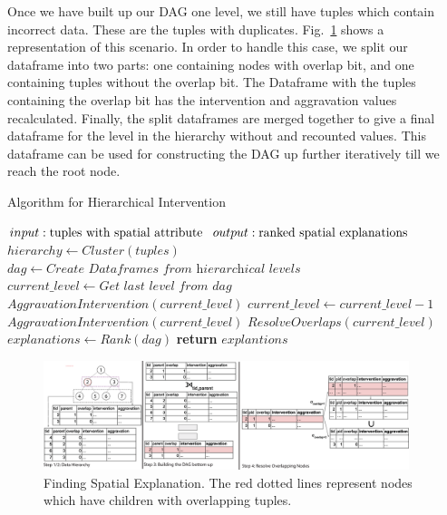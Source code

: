 Once we have built up our DAG one level, we still have tuples which contain incorrect data. These are the tuples with duplicates. Fig.~\ref{fig:steps} shows a representation of this scenario. In order to handle this case, we split our dataframe into two parts: one containing nodes with overlap bit, and one containing tuples without the overlap bit. The Dataframe with the tuples containing the overlap bit has the intervention and aggravation values recalculated. Finally, the split dataframes are merged together to give a final dataframe for the level in the hierarchy without and recounted values. This dataframe can be used for constructing the DAG up further iteratively till we reach the root node.

\begin{algorithm}
	\caption{Algorithm for Hierarchical Intervention}\label{alg:hieint}
	\begin{algorithmic}[1]
		\State $input: \textnormal{tuples with spatial attribute}$
		\State $output: \textnormal{ranked spatial explanations}$
		\State $hierarchy \gets Cluster(tuples)$
		\State $dag \gets \textit{Create Dataframes from hierarchical levels}$
		\State $current\_level \gets \textit{Get last level from }dag$
		\State $AggravationIntervention(current\_level)$
		\State $current\_level \gets current\_level - 1$
		\State $AggravationIntervention(current\_level)$
		\State $ResolveOverlaps(current\_level)$
		\EndWhile
		\State $explanations \gets Rank(dag)$
		\State \textbf{return} $explantions$
		\EndProcedure
	\end{algorithmic}
\end{algorithm}




\begin{figure}[t]
	\centerline{\includegraphics[width=0.95\textwidth]{images/steps}}
	\caption{Finding Spatial Explanation. The red dotted lines represent nodes which have children with overlapping tuples.}
	\label{fig:steps}
\end{figure}


